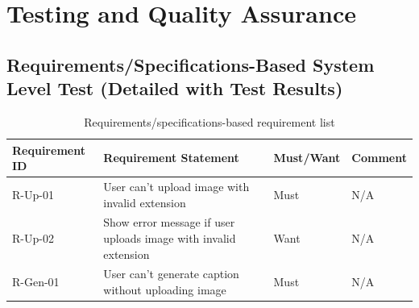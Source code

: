 \chapter{Testing and Quality Assurance}\label{ch:test}

\section{Requirements/Specifications-Based System Level Test (Detailed with Test Results)}

\begin{table}[htbp]
\centering
\caption{Requirements/specifications-based requirement list}\label{tab:reqlist}
\begin{tabularx}{\textwidth}{@{}l X l l@{}}
\toprule
\textbf{Requirement ID} & \textbf{Requirement Statement} & \textbf{Must/Want} & \textbf{Comment}\\
\midrule
R-Up-01 & User can't upload image with invalid extension & Must & N/A\\
R-Up-02 & Show error message if user uploads image with invalid extension & Want & N/A\\
R-Gen-01 & User can't generate caption without uploading image & Must & N/A\\
\bottomrule
\end{tabularx}
\end{table}

